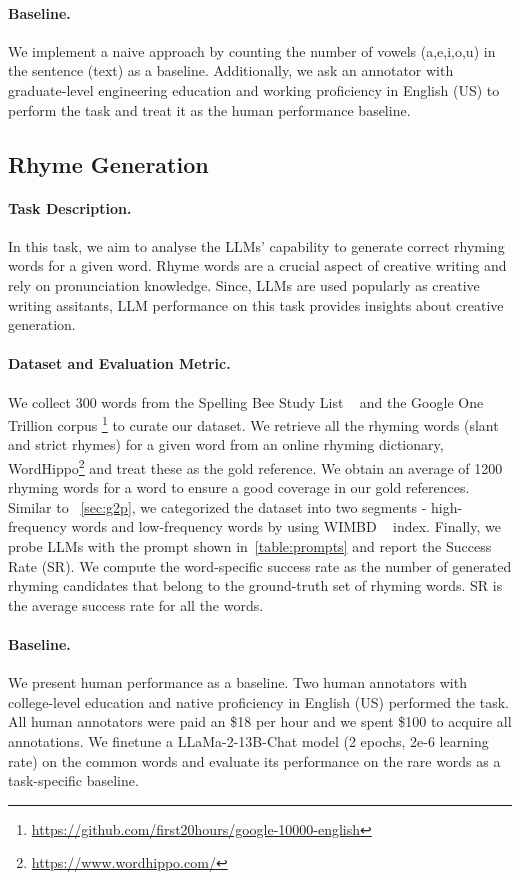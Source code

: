 \paragraph{Baseline.} 
We implement a naive approach by counting the number of vowels (a,e,i,o,u) in the sentence (text) as a baseline. Additionally, we ask an annotator with graduate-level engineering education and working proficiency in English (US) to perform the task and treat it as the human performance baseline. 

\subsection{Rhyme Generation}
\label{sec:rhyme}
\paragraph{Task Description.} In this task, we aim to analyse the LLMs' capability to generate correct rhyming words for a given word. Rhyme words are a crucial aspect of creative writing and rely on pronunciation knowledge. Since, LLMs are used popularly as creative writing assitants, LLM performance on this task provides insights about creative generation.  

\paragraph{Dataset and Evaluation Metric.} We collect 300 words from the Spelling Bee Study List ~\citep{maguire2006american} and the Google One Trillion corpus \footnote{\url{https://github.com/first20hours/google-10000-english}} to curate our dataset. We retrieve all the rhyming words (slant and strict rhymes) for a given word from an online rhyming dictionary, WordHippo\footnote{\url{https://www.wordhippo.com/}} and treat these as the gold reference. We obtain an average of 1200 rhyming words for a word to ensure a good coverage in our gold references.  Similar to ~\autoref{sec:g2p}, we categorized the dataset into two segments - high-frequency words and low-frequency words by using WIMBD ~\citep{elazar2024whats} index. Finally, we probe LLMs with the prompt shown in~\autoref{table:prompts} and report the Success Rate (SR). We compute the word-specific success rate as the number of generated rhyming candidates that belong to the ground-truth set of rhyming words. SR is the average success rate for all the words.

\paragraph{Baseline.} We present human performance as a baseline. Two human annotators with college-level education and native proficiency in English (US) performed the task. All human annotators were paid an \$18 per hour and we spent \$100 to acquire all annotations. We finetune a LLaMa-2-13B-Chat model (2 epochs, 2e-6 learning rate) on the common words and evaluate its performance on the rare words as a task-specific baseline.


